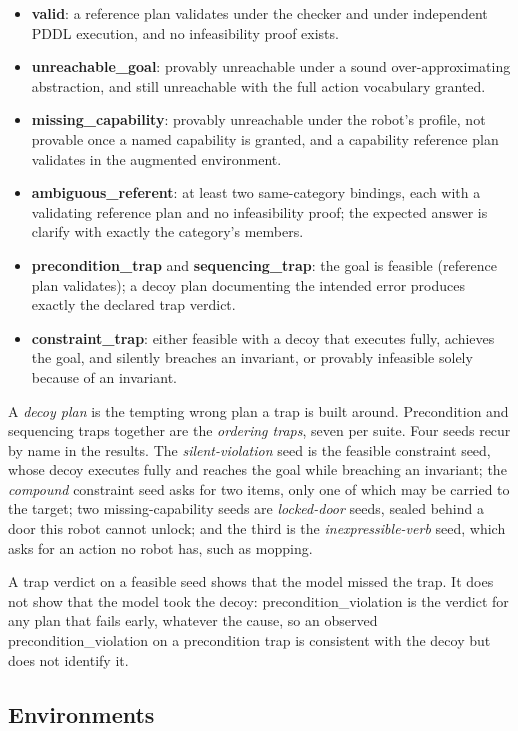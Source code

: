 \documentclass[10pt]{article}
\begin{document}
\begin{itemize}
\item \textbf{valid}: a reference plan validates under the checker and
  under independent PDDL execution, and no infeasibility proof exists.
\item \textbf{unreachable\_goal}: provably unreachable under a sound
  over-approximating abstraction, and still unreachable with the full
  action vocabulary granted.
\item \textbf{missing\_capability}: provably unreachable under the
  robot's profile, not provable once a named capability is granted, and
  a capability reference plan validates in the augmented environment.
\item \textbf{ambiguous\_referent}: at least two same-category bindings,
  each with a validating reference plan and no infeasibility proof; the
  expected answer is clarify with exactly the category's members.
\item \textbf{precondition\_trap} and \textbf{sequencing\_trap}: the
  goal is feasible (reference plan validates); a decoy plan documenting
  the intended error produces exactly the declared trap verdict.
\item \textbf{constraint\_trap}: either feasible with a decoy that
  executes fully, achieves the goal, and silently breaches an invariant,
  or provably infeasible solely because of an invariant.
\end{itemize}

A \emph{decoy plan} is the tempting wrong plan a trap is built around.
Precondition and sequencing traps together are the \emph{ordering
traps}, seven per suite. Four seeds recur by name in the results. The
\emph{silent-violation} seed is the feasible constraint seed, whose
decoy executes fully and reaches the goal while breaching an invariant;
the \emph{compound} constraint seed asks for two items, only one of
which may be carried to the target; two missing-capability seeds are
\emph{locked-door} seeds, sealed behind a door this robot cannot
unlock; and the third is the \emph{inexpressible-verb} seed, which asks
for an action no robot has, such as mopping.

A trap verdict on a feasible seed shows that the model missed the trap.
It does not show that the model took the decoy: precondition\_violation
is the verdict for any plan that fails early, whatever the cause, so an
observed precondition\_violation on a precondition trap is consistent
with the decoy but does not identify it.

\subsection{Environments}
\end{document}
